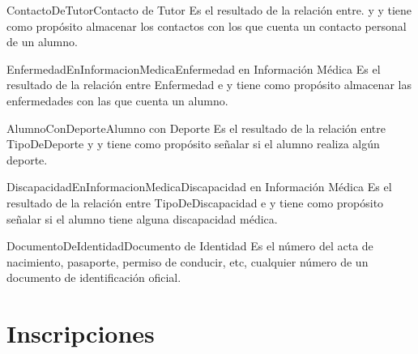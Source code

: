 \begin{cdtEntidad}{ContactoDeTutor}{Contacto de Tutor}{%
    Es el resultado de la relación entre.  y  y tiene como propósito almacenar los contactos con los que cuenta un contacto personal de un alumno.
}
\end{cdtEntidad}

\begin{cdtEntidad}{EnfermedadEnInformacionMedica}{Enfermedad en Información Médica}{%
    Es el resultado de la relación entre  Enfermedad e  y tiene como propósito almacenar las enfermedades con las que cuenta un alumno.}

	
\end{cdtEntidad}

\begin{cdtEntidad}{AlumnoConDeporte}{Alumno con Deporte}{%
    Es el resultado de la relación entre TipoDeDeporte y  y tiene como propósito señalar si el alumno realiza algún deporte.}
\end{cdtEntidad}

\begin{cdtEntidad}{DiscapacidadEnInformacionMedica}{Discapacidad en Información Médica}{%
    Es el resultado de la relación entre TipoDeDiscapacidad e  y tiene como propósito señalar si el alumno tiene alguna discapacidad médica.}
\end{cdtEntidad}


\begin{cdtEntidad}{DocumentoDeIdentidad}{Documento de Identidad}{%
    Es el número del acta de nacimiento, pasaporte, permiso de conducir, etc, cualquier número de un documento de identificación oficial.}
	\cdtEntityRelSection
\end{cdtEntidad}



\section{Inscripciones}

